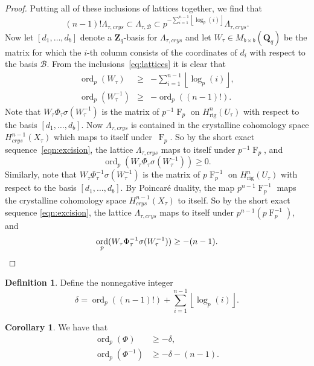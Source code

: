 \documentclass[a4paper,11pt]{article}
\numberwithin{equation}{section}
\providecommand{\floor}[1]{\left\lfloor#1\right\rfloor}   %
\newcommand{\ZZ}{\mathbf{Z}} %
\newcommand{\QQ}{\mathbf{Q}} %
\DeclareMathOperator{\ord}{ord}          %
\DeclareMathOperator{\Frob}{F}           %
\providecommand{\Hrig}{H_{\text{rig}}}  %
\providecommand{\cB}{\mathcal{B}} %
\theoremstyle{definition}
\newtheorem{cor}[thm]{Corollary}
\newtheorem{defn}[thm]{Definition}
\begin{document}
\begin{proof}
Putting all of these inclusions of lattices together, we find that
\begin{equation} \label{eq:lattices}
(n-1)! \Lambda_{\tau,crys} \subset \Lambda_{\tau,\cB} \subset p^{-\sum_{i=1}^{n-1} \floor{\log_p(i)}} \Lambda_{\tau,crys}.
\end{equation}
Now let $[d_1, \ldots, d_b]$ denote a $\ZZ_q$-basis for $\Lambda_{\tau,crys}$ and 
let $W_{\tau} \in M_{b \times b}(\QQ_q)$ be the matrix for which the $i$-th column 
consists of the coordinates of $d_i$ with respect to the basis $\cB$. From the 
inclusions~\eqref{eq:lattices} it is clear that 
\begin{eqnarray*}
\ord_p(W_{\tau}) &\geq& -\sum_{i=1}^{n-1} \floor{\log_p(i)}, \\
\ord_p(W_{\tau}^{-1}) &\geq& -\ord_p((n-1)!).
\end{eqnarray*}
Note that $W_{\tau} \Phi_{\tau} \sigma(W_{\tau}^{-1})$ is the matrix of 
$p^{-1}\Frob_{p}$ on $\Hrig^n(U_{\tau})$ with respect to the basis 
$[d_1,\ldots,d_b]$. Now $\Lambda_{\tau,crys}$ is contained in the crystalline 
cohomology space $H^{n-1}_{crys}(X_{\tau})$ which maps to itself 
under~$\Frob_p$. So by the short exact sequence~\eqref{eqn:excision}, the 
lattice $\Lambda_{\tau,crys}$ maps to itself under $p^{-1}\Frob_{p}$, and
\[
\ord_p(W_{\tau} \Phi_{\tau} \sigma(W_{\tau}^{-1})) \geq 0.
\]
Similarly, note that $W_{\tau} \Phi_{\tau}^{-1} \sigma(W_{\tau}^{-1})$ is 
the matrix of $p\Frob_p^{-1}$ on $\Hrig^n(U_{\tau})$ with respect to the 
basis $[d_1,\ldots,d_b]$. By Poincar\'e duality, the map $p^{n-1}\Frob_p^{-1}$ 
maps the crystalline cohomology space $H^{n-1}_{crys}(X_{\tau})$ to itself. 
So by the short exact sequence \eqref{eqn:excision}, the lattice 
$\Lambda_{\tau,crys}$ maps to itself under $p^{n-1} (p\Frob_p^{-1})$, and 
\begin{equation*}
\ord_p(W_{\tau} \Phi_{\tau}^{-1} \sigma(W_{\tau}^{-1})) \geq -(n-1). \qedhere
\end{equation*}
\end{proof}

\begin{defn} \label{defn:delta}
Define the nonnegative integer
\[
\delta = \ord_p((n-1)!)+\sum_{i=1}^{n-1} \floor{\log_p(i)}.
\]
\end{defn}

\begin{cor} \label{cor:delta} We have that
\begin{align*}
\ord_p(\Phi) &\geq -\delta, \\
\ord_p(\Phi^{-1}) &\geq -\delta-(n-1).
\end{align*}
\end{cor}
\end{document}
